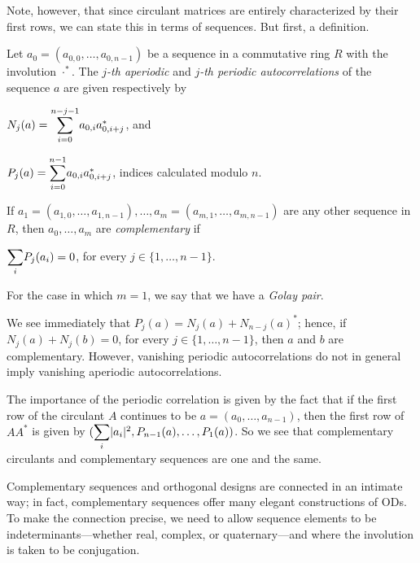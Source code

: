 \documentclass[../../../main]{subfiles}
\begin{document}
 Note, however, that since circulant matrices are entirely characterized by
 their first rows, we can state this in terms of sequences. But first, a definition.
 
 \begin{defin}
  Let $a_0=(a_{0,0}, \dots, a_{0,n-1})$ be a sequence in a commutative ring $R$ with the involution $\cdot^*$. The {\it $j$-th aperiodic} and {\it $j$-th periodic autocorrelations} of the sequence $a$ are given respectively by
  \begin{defenum}
   \item $N_j(a)=\ssum_{i=0}^{n-j-1}a_{0,i}a_{0,i+j}^*$, and
   \item $P_j(a)=\ssum_{i=0}^{n-1}a_{0,i}a_{0,i+j}^*$, indices calculated modulo $n$.
  \end{defenum}
  If $a_1=(a_{1,0},\dots,a_{1,n-1}),\dots,a_m=(a_{m,1},\dots,a_{m,n-1})$ are any other sequence in $R$, then $a_0,\dots,a_m$ are {\it complementary} if
  \begin{defenum}[resume]
   \item\label{periodic-comp} $\ssum_i P_j(a_i)=0$, for every $j \in \{1, \dots, n-1\}$.
  \end{defenum}
  For the case in which $m=1$, we say that we have a {\it Golay pair}.
 \end{defin}
 
 We see immediately that $P_j(a)=N_j(a) + N_{n-j}(a)^*$; hence, if $N_j(a)+N_j(b)=0$, for every $j \in \{1,\dots,n-1\}$, then $a$ and $b$ are complementary. However, vanishing periodic autocorrelations do not in general imply vanishing aperiodic autocorrelations.
 
 The importance of the periodic correlation is given by the fact that if the first row of the circulant $A$ continues to be $a=(a_0,\dots,a_{n-1})$, then the first row of $AA^*$ is given by $(\ssum_i|a_i|^2,P_{n-1}(a), \dots,P_1(a))$. So we see that complementary circulants and complementary sequences are one and the same.
 
 Complementary sequences and orthogonal designs are connected in an intimate way; in fact, complementary sequences offer many elegant constructions of ODs. To make the connection precise, we need to allow sequence elements to be indeterminants---whether real, complex, or quaternary---and where the involution is taken to be conjugation.
 
\end{document}
